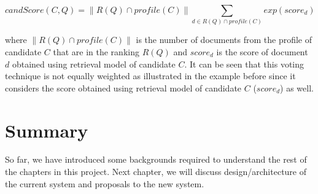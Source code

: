 \begin{table}
\centering
{}
\caption{R(Q)} \label{table:ranking}
\end{table}
\quad
\begin{table}
\centering
{}
\caption{Profiles} \label{table:profiles}
\end{table}

\begin{equation}
 candScore(C,Q) = \|R(Q) \cap profile(C)\| \sum_{d \in R(Q) \cap profile(C)} exp(score_d)
\end{equation}

where $\|R(Q) \cap profile(C)\|$ is the number of documents from the profile of candidate $C$ that are in the ranking $R(Q)$ and $score_d$ is the score
of document $d$ obtained using retrieval model of candidate $C$. 
It can be seen that this voting technique is not equally weighted as illustrated in the example before
since it considers the score obtained using retrieval model of candidate $C$ ($score_d$) as well.

\section{Summary}
So far, we have introduced some backgrounds required to understand the rest of the chapters in this project. Next chapter, we will discuss 
design/architecture of the current system and proposals to the new system.